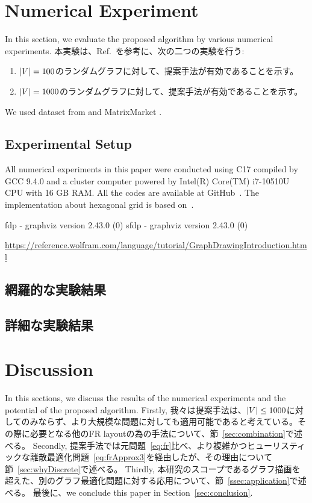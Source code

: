 \documentclass[dvipdfmx,lettersize,journal]{IEEEtran}
\newcommand{\Cpp}{C\nolinebreak[4]\hspace{-.05em}\raisebox{.4ex}{\relsize{-3}{\textbf{++}}}}
\begin{document}
\section{Numerical Experiment} \label{sec:experiment}

In this section, we evaluate the proposed algorithm by various numerical experiments.
本実験は、Ref.~\cite{8419285}を参考に、次の二つの実験を行う:
\begin{enumerate}
  \item $\abs{V} = 100$のランダムグラフに対して、提案手法が有効であることを示す。
  \item $\abs{V} = 1000$のランダムグラフに対して、提案手法が有効であることを示す。
\end{enumerate}
We used dataset from \cite{davis2011university} and MatrixMarket \cite{boisvertMatrixMarketWeb1997}.

\subsection{Experimental Setup}\label{ssec:setup}
All numerical experiments in this paper were conducted using \Cpp17
compiled by GCC 9.4.0 and a cluster computer powered by Intel(R) Core(TM) i7-10510U CPU with 16 GB RAM.
All the codes are available at GitHub~\cite{Hamaguchi_stabilizer_extent_2024}.
The implementation about hexagonal grid is based on~\cite{patelHexagonalGrids2013}.

fdp - graphviz version 2.43.0 (0)
sfdp - graphviz version 2.43.0 (0)

\url{https://reference.wolfram.com/language/tutorial/GraphDrawingIntroduction.html}

\subsection{網羅的な実験結果}\label{ssec:exprAll}
\subsection{詳細な実験結果}\label{ssec:exprDetail}

\section{Discussion} \label{sec:discussion}

In this sections, we discuss the results of the numerical experiments and the potential of the proposed algorithm.
Firstly, 我々は提案手法は、$\abs{V} \leq 1000$に対してのみならず、より大規模な問題に対しても適用可能であると考えている。その際に必要となる他のFR layoutの為の手法について、節~\ref{sec:combination}で述べる。
Secondly, 提案手法では元問題~\eqref{eq:fr}比べ、より複雑かつヒューリスティックな離散最適化問題~\eqref{eq:frApprox3}を経由したが、その理由について節~\ref{sec:whyDiscrete}で述べる。
Thirdly, 本研究のスコープであるグラフ描画を超えた、別のグラフ最適化問題に対する応用について、節~\ref{ssec:application}で述べる。
最後に、we conclude this paper in Section~\ref{sec:conclusion}.
\end{document}
